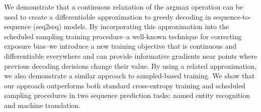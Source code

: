 We demonstrate that a continuous relaxation of the argmax operation can be used to create a differentiable approximation to greedy decoding in sequence-to-sequence (seq2seq) models. By incorporating this approximation into the scheduled sampling training procedure--a well-known technique for correcting exposure bias--we introduce a new training objective that is continuous and differentiable everywhere and can provide informative gradients near points where previous decoding decisions change their value. By using a related approximation, we also demonstrate  a similar approach to sampled-based training. We show that our approach outperforms both standard cross-entropy training and scheduled sampling procedures in two sequence prediction tasks: named entity recognition and machine translation.
